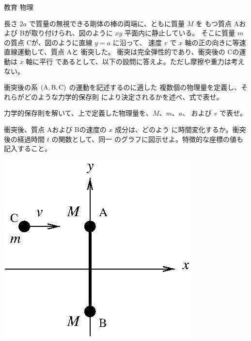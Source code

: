 \documentclass[fleqn]{jbook}
\begin{document}
\begin{question}{教育 物理}{}

\def\PA{{\rm A}}
\def\PB{{\rm B}}
\def\PC{{\rm C}}


\begin{subquestions}
\SubQuestion
  長さ $2a$ で質量の無視できる剛体の棒の両端に、ともに質量 $M$ を
  もつ質点 \PA および \PB が取り付けられ、図のように $xy$
  平面内に静止している。
  そこに質量 $m$ の質点 \PC が、図のように直線 $y=a$ に沿って、
  速度 $v$ で $x$ 軸の正の向きに等速直線運動して、質点 \PA と
  衝突した。
  衝突は完全弾性的であり、衝突後の \PC の運動は $x$ 軸に平行
  であるとして、以下の設問に答えよ。ただし摩擦や重力は考えない。

  \parbox[t]{105mm}{
  \begin{subsubquestions}
  \SubSubQuestion
    衝突後の系 $(\PA,\PB,\PC)$ の運動を記述するのに適した
    複数個の物理量を定義し、それらがどのような力学的保存則
    により決定されるかを述べ、式で表せ。

  \SubSubQuestion
    力学的保存則を解いて、上で定義した物理量を、$M$、$m$、$a$、
    および $v$ で表せ。

  \SubSubQuestion
    衝突後、質点 \PA および \PB の速度の $x$ 成分は、どのよう
    に時間変化するか。衝突後の経過時間 $t$ の関数として、同一
    のグラフに図示せよ。特徴的な座標の値も記入すること。

  \end{subsubquestions}

  }\parbox[t]{55mm}{
  \vspace*{-5mm}\begin{center}
    \mbox{\includegraphics[clip]{1996phys-1.eps}}
  \end{center}}
  

\end{subquestions}
\end{question}
\end{document}
